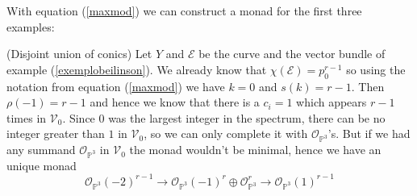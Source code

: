 \documentclass[
	oldfontcommands,
	sumario=abnt-6027-2012,
	12pt,			%
	openright,		%
	oneside,		%
	a4paper,		%
	english,		%
	brazil			%
	]{imecc-unicamp}
\begin{document}
With equation (\ref{maxmod}) we can construct a monad for the first three examples:
\begin{example}(Disjoint union of conics)
Let $Y$ and $\mathcal{E}$ be the curve and the vector bundle of example (\ref{exemplobeilinson}). We already know that $\chi(\mathcal{E})=p_0^{r-1}$ so using the notation from equation (\ref{maxmod}) we have $k=0$ and $s(k)=r-1$. Then $\rho(-1)=r-1$ and hence we know that there is a $c_i=1$ which appears $r-1$ times in $\mathcal{V}_0$. Since $0$ was the largest integer in the spectrum, there can be no integer greater than $1$ in $\mathcal{V}_0$, so we can only complete it with $\mathcal{O}_{\mathbb{P}^3}$'s. But if we had any summand $\mathcal{O}_{\mathbb{P}^3}$ in $\mathcal{V}_0$ the monad wouldn't be minimal, hence we have an unique monad
\begin{equation}
 \mathcal{O}_{\mathbb{P}^3}(-2)^{r-1} \to \mathcal{O}_{\mathbb{P}^3}(-1)^{r} \oplus \mathcal{O}_{\mathbb{P}^3}^{r} \to \mathcal{O}_{\mathbb{P}^3}(1)^{r-1}
\end{equation}
\end{example}
\end{document}
